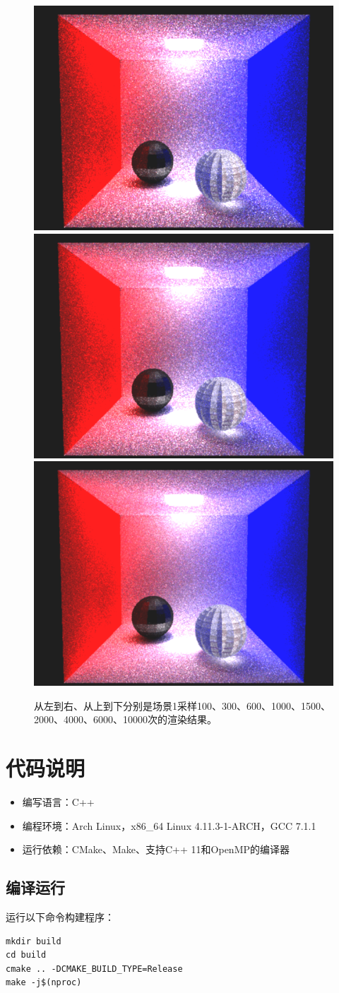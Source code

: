 \documentclass[10pt,a4paper]{article}
\begin{document}
\begin{figure}[htbp]
  \includegraphics[width=.4\textwidth]{./figs/scene01_04000.png}
  \includegraphics[width=.4\textwidth]{./figs/scene01_06000.png}
  \includegraphics[width=.4\textwidth]{./figs/scene01_10000.png}
  \caption{从左到右、从上到下分别是场景1采样100、300、600、1000、1500、2000、4000、6000、10000次的渲染结果。}
  \label{fig:scene01}
\end{figure}

\newpage
\section{代码说明}
\begin{itemize}\small
  \item 编写语言：C++
  \item 编程环境：Arch Linux，x86\_64 Linux 4.11.3-1-ARCH，GCC 7.1.1
  \item 运行依赖：CMake、Make、支持C++ 11和OpenMP的编译器
\end{itemize}

\subsection{编译运行}
运行以下命令构建程序：
\begin{lstlisting}
mkdir build
cd build
cmake .. -DCMAKE_BUILD_TYPE=Release
make -j$(nproc)
\end{lstlisting}
\end{document}
